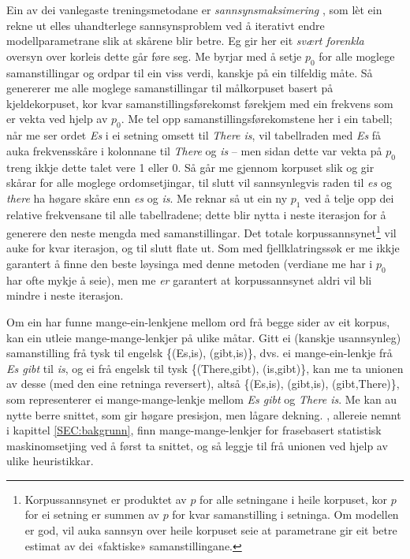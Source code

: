 \documentclass[12pt,a4paper,oneside,draft]{report}
\begin{document}
 Ein av dei vanlegaste treningsmetodane er \emph{sannsynsmaksimering}
 \citep[utførleg forklart i][]{prescher-em}, som lèt ein rekne ut
 elles uhandterlege sannsynsproblem ved å iterativt endre
 modellparametrane slik at skårene blir betre. Eg gir her eit \emph{svært  forenkla} oversyn over korleis dette går føre seg. Me byrjar med å
 setje $p_0$ for alle moglege samanstillingar og ordpar til ein viss
 verdi, kanskje på ein tilfeldig måte. Så genererer me alle moglege
 samanstillingar til målkorpuset basert på kjeldekorpuset, kor kvar
 samanstillingsførekomst førekjem med ein frekvens som er vekta ved
 hjelp av $p_0$. Me tel opp samanstillingsførekomstene her i ein
 tabell; når me ser ordet \emph{Es} i ei setning omsett til \emph{There is}, vil
 tabellraden med \emph{Es} få auka frekvensskåre i kolonnane til \emph{There} og
 \emph{is} -- men sidan dette var vekta på $p_0$ treng ikkje dette talet
 vere 1 eller 0. Så går me gjennom korpuset slik og gir skårar for
 alle moglege ordomsetjingar, til slutt vil sannsynlegvis raden til
 \emph{es} og \emph{there} ha høgare skåre enn \emph{es} og \emph{is}. Me reknar så ut ein
 ny $p_1$ ved å telje opp dei relative frekvensane til alle
 tabellradene; dette blir nytta i neste iterasjon for å generere den
 neste mengda med samanstillingar. Det totale korpussannsynet\footnote{Korpussannsynet er produktet av $p$ for alle setningane i
        heile korpuset, kor $p$ for ei setning er summen av $p$ for
        kvar samanstilling i setninga. Om modellen er god, vil auka
        sannsyn over heile korpuset seie at parametrane gir eit betre
        estimat av dei «faktiske» samanstillingane. }
 vil auke for kvar iterasjon, og til slutt flate ut. Som med
 fjellklatringssøk er me ikkje garantert å finne den beste løysinga
 med denne metoden (verdiane me har i $p_0$ har ofte mykje å seie),
 men me \emph{er} garantert at korpussannsynet aldri vil bli mindre i neste
 iterasjon.

 Om ein har funne mange-ein-lenkjene mellom ord frå begge sider av eit
 korpus, kan ein utleie mange-mange-lenkjer på ulike måtar. Gitt ei
 (kanskje usannsynleg) samanstilling frå tysk til engelsk
 \{(Es,is), (gibt,is)\}, dvs. ei mange-ein-lenkje frå \emph{Es gibt} til
 \emph{is}, og ei frå engelsk til tysk \{(There,gibt), (is,gibt)\}, kan me
 ta unionen av desse (med den eine retninga reversert), altså
 \{(Es,is), (gibt,is), (gibt,There)\}, som representerer ei
 mange-mange-lenkje mellom \emph{Es gibt} og \emph{There is}. Me kan au nytte
 berre snittet, som gir høgare presisjon, men lågare dekning.
 \citet{koehn2003spb}, allereie nemnt i kapittel \ref{SEC:bakgrunn},
 finn mange-mange-lenkjer for frasebasert statistisk maskinomsetjing
 ved å først ta snittet, og så leggje til frå unionen ved hjelp av
 ulike heuristikkar.
\end{document}
